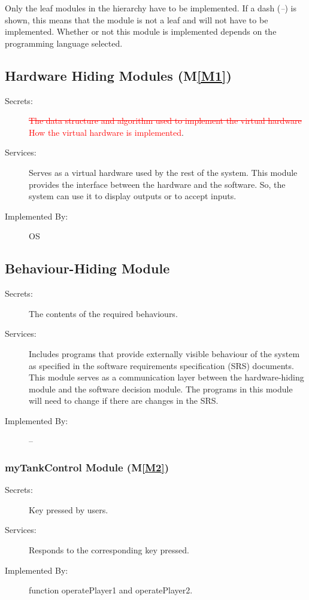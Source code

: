 \documentclass[12pt, titlepage]{article}
\newcommand{\mref}[1]{M\ref{#1}}
\begin{document}
Only the leaf modules in the
hierarchy have to be implemented. If a dash (\emph{--}) is shown, this means
that the module is not a leaf and will not have to be implemented. Whether or
not this module is implemented depends on the programming language
selected.

\subsection{Hardware Hiding Modules (\mref{M1})}

\begin{description}
\item[Secrets:]\textcolor{red}{\sout{The data structure and algorithm used to implement the virtual
  hardware}\\ How the virtual hardware is implemented}.
\item[Services:]Serves as a virtual hardware used by the rest of the
  system. This module provides the interface between the hardware and the
  software. So, the system can use it to display outputs or to accept inputs.
\item[Implemented By:] OS
\end{description}

\subsection{Behaviour-Hiding Module}

\begin{description}
\item[Secrets:]The contents of the required behaviours.
\item[Services:]Includes programs that provide externally visible behaviour of
  the system as specified in the software requirements specification (SRS)
  documents. This module serves as a communication layer between the
  hardware-hiding module and the software decision module. The programs in this
  module will need to change if there are changes in the SRS.
\item[Implemented By:] --
\end{description}

\subsubsection{myTankControl Module (\mref{M2})}

\begin{description}
\item[Secrets:]Key pressed by users.
\item[Services:]Responds to the corresponding key pressed.
\item[Implemented By:] function operatePlayer1 and operatePlayer2.
\end{description}
\end{document}
